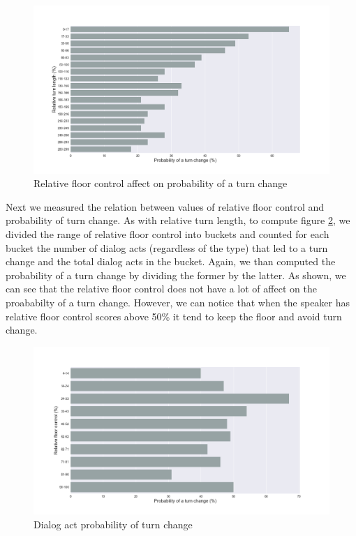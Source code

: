 \begin{figure}[ht!]
\centering
\includegraphics[width=\textwidth]{../scikitlearn/figures/f5.png}
\caption{Relative floor control affect on probability of a turn change\label{overflow}}
\label{f4}
\end{figure}

Next we measured the relation between values of relative floor control and probability of turn change.
As with relative turn length, to compute figure \ref{f4}, we divided the range of relative floor control into buckets and counted for each bucket the number of dialog acts (regardless of the type) that led to a turn change and the total dialog acts in the bucket.
Again, we than computed the probability of a turn change by dividing the former by the latter. As shown, 
we can see that the relative floor control does not have a lot of affect on the proababilty of a turn change. However, we can notice that when the speaker has relative floor control scores above 50\% it tend to keep the floor and avoid turn change.

\begin{figure}[ht!]
\centering
\includegraphics[width=\textwidth]{../scikitlearn/figures/f6.png}
\caption{Dialog act probability of turn change\label{overflow}}
\label{f4}
\end{figure}
